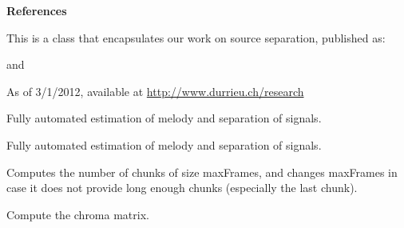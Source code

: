 \documentclass[letterpaper,10pt,english]{sphinxmanual}
\begin{document}
\begin{fulllineitems}
\begin{quote}
\begin{description}
\end{description}
\end{quote}

\textbf{References}

This is a class that encapsulates our work on source separation,
published as:

and

As of 3/1/2012, available at \href{http://www.durrieu.ch/research}{http://www.durrieu.ch/research}

\begin{fulllineitems}
\label{reference/separateleadstereo:pyfasst.SeparateLeadStereo.SeparateLeadStereoTF.SeparateLeadProcess.autoMelSepAndWrite}
Fully automated estimation of melody and separation of signals.

\end{fulllineitems}


\begin{fulllineitems}
\label{reference/separateleadstereo:pyfasst.SeparateLeadStereo.SeparateLeadStereoTF.SeparateLeadProcess.automaticMelodyAndSeparation}
Fully automated estimation of melody and separation of signals.

\end{fulllineitems}


\begin{fulllineitems}
\label{reference/separateleadstereo:pyfasst.SeparateLeadStereo.SeparateLeadStereoTF.SeparateLeadProcess.checkChunkSize}
Computes the number of chunks of size maxFrames, and
changes maxFrames in case it does not provide long enough
chunks (especially the last chunk).

\end{fulllineitems}


\begin{fulllineitems}
\label{reference/separateleadstereo:pyfasst.SeparateLeadStereo.SeparateLeadStereoTF.SeparateLeadProcess.computeChroma}
Compute the chroma matrix.


\end{fulllineitems}
\end{fulllineitems}
\end{document}
